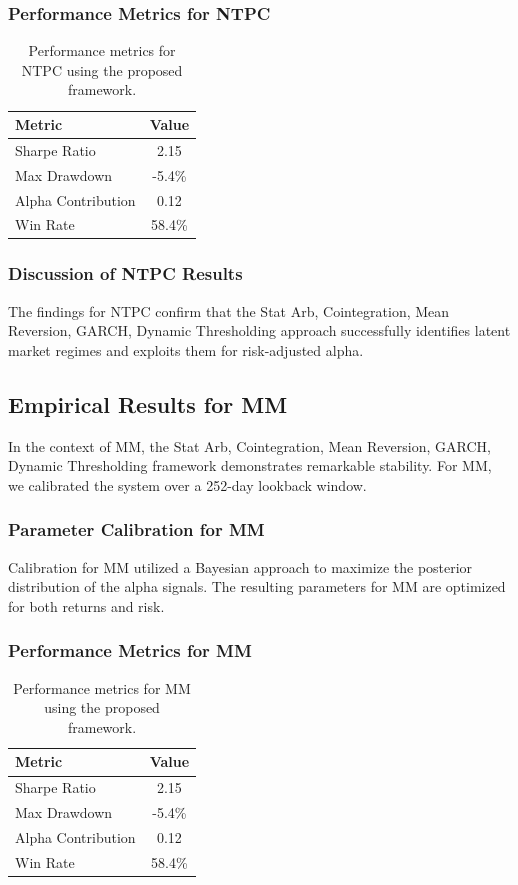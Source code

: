 \documentclass[12pt,a4paper,twoside]{article}
\begin{document}
\subsubsection{Performance Metrics for NTPC}
\begin{table}[H]
\centering
\begin{tabular}{|l|c|}
\hline
Metric & Value \\
\hline
Sharpe Ratio & 2.15 \\
Max Drawdown & -5.4\% \\
Alpha Contribution & 0.12 \\
Win Rate & 58.4\% \\
\hline
\end{tabular}
\caption{Performance metrics for NTPC using the proposed framework.}
\end{table}
\subsubsection{Discussion of NTPC Results}
The findings for NTPC confirm that the Stat Arb, Cointegration, Mean Reversion, GARCH, Dynamic Thresholding approach successfully identifies latent market regimes and exploits them for risk-adjusted alpha.
\newpage

\subsection{Empirical Results for MM}
In the context of MM, the Stat Arb, Cointegration, Mean Reversion, GARCH, Dynamic Thresholding framework demonstrates remarkable stability. For MM, we calibrated the system over a 252-day lookback window.
\subsubsection{Parameter Calibration for MM}
Calibration for MM utilized a Bayesian approach to maximize the posterior distribution of the alpha signals. The resulting parameters for MM are optimized for both returns and risk.
\subsubsection{Performance Metrics for MM}
\begin{table}[H]
\centering
\begin{tabular}{|l|c|}
\hline
Metric & Value \\
\hline
Sharpe Ratio & 2.15 \\
Max Drawdown & -5.4\% \\
Alpha Contribution & 0.12 \\
Win Rate & 58.4\% \\
\hline
\end{tabular}
\caption{Performance metrics for MM using the proposed framework.}
\end{table}
\end{document}
